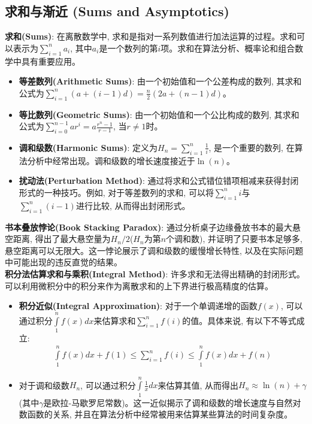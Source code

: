 \documentclass[12pt, a4paper, UTF8]{ctexart}
\newcommand{\term}[1]{\textbf{\textcolor{blue!80!black}{#1}}}
\newcommand{\emphb}[1]{\textbf{#1}}
\begin{document}
\begin{sloppypar}
    \subsection{求和与渐近 (Sums and Asymptotics)}
    \term{求和(Sums)}: 在离散数学中, 求和是指对一系列数值进行加法运算的过程。求和可以表示为$\sum\limits_{i=1}^{n} a_i$, 其中$a_i$是一个数列的第$i$项。求和在算法分析、概率论和组合数学中具有重要应用。
    \begin{itemize}[nosep]
        \item \term{等差数列(Arithmetic Sums)}: 由一个初始值和一个公差构成的数列, 其求和公式为$\sum\limits_{i=1}^{n} (a + (i-1)d) = \frac{n}{2}(2a + (n-1)d)$。
        \item \term{等比数列(Geometric Sums)}: 由一个初始值和一个公比构成的数列, 其求和公式为$\sum\limits_{i=0}^{n-1} ar^i = a \frac{r^n - 1}{r - 1}$, 当$r \neq 1$时。
        \item \term{调和级数(Harmonic Sums)}: 定义为$H_n = \sum\limits_{i=1}^{n} \frac{1}{i}$, 是一个重要的数列, 在算法分析中经常出现。调和级数的增长速度接近于$\ln(n)$。
        \item \term{扰动法(Perturbation Method)}: 通过将求和公式错位错项相减来获得封闭形式的一种技巧。例如, 对于等差数列的求和, 可以将$\sum\limits_{i=1}^{n} i$与$\sum\limits_{i=1}^{n} (i-1)$进行比较, 从而得出封闭形式。
    \end{itemize}
    \emphb{书本叠放悖论(Book Stacking Paradox)}: 通过分析桌子边缘叠放书本的最大悬空距离, 得出了最大悬空量为$H_n/2$($H_n$为第$n$个调和数), 并证明了只要书本足够多, 悬空距离可以无限大。这一悖论展示了调和级数的缓慢增长特性, 以及在实际问题中可能出现的违反直觉的结果。\\
    \emphb{积分法估算求和与乘积(Integral Method)}: 许多求和无法得出精确的封闭形式。可以利用微积分中的积分来作为离散求和的上下界进行极高精度的估算。
    \begin{itemize}[nosep]
        \item \term{积分近似(Integral Approximation)}: 对于一个单调递增的函数$f(x)$, 可以通过积分$\int\limits_{1}^{n} f(x) dx$来估算求和$\sum\limits_{i=1}^{n} f(i)$的值。具体来说, 有以下不等式成立:
              \begin{align*}
                  \int\limits_{1}^{n} f(x) dx + f(1) \leq \sum\limits_{i=1}^{n} f(i) \leq \int\limits_{1}^{n} f(x) dx + f(n)
              \end{align*}
        \item 对于调和级数$H_n$, 可以通过积分$\int\limits_{1}^{n} \frac{1}{x} dx$来估算其值, 从而得出$H_n \approx \ln(n) + \gamma$ (其中$\gamma$是欧拉-马歇罗尼常数)。这一近似揭示了调和级数的增长速度与自然对数函数的关系, 并且在算法分析中经常被用来估算某些算法的时间复杂度。

\end{itemize}
\end{sloppypar}
\end{document}
